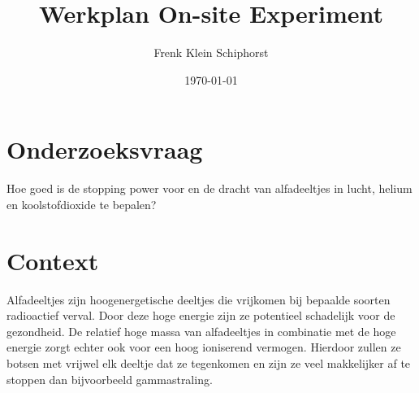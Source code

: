\documentclass[11pt,a4paper]{article}
\author{Frenk Klein Schiphorst} %
\title{Werkplan On-site Experiment} %
\date{\today}
\begin{document}
\suppressfloats[t]      %


\section{Onderzoeksvraag}
Hoe goed is de stopping power voor en de dracht van alfadeeltjes in lucht, helium en koolstofdioxide te bepalen?

\section{Context}
Alfadeeltjes zijn hoogenergetische deeltjes die vrijkomen bij bepaalde soorten radioactief verval. Door deze hoge energie zijn ze potentieel schadelijk voor de gezondheid. De relatief hoge massa van alfadeeltjes in combinatie met de hoge energie zorgt echter ook voor een hoog ioniserend vermogen. Hierdoor zullen ze botsen met vrijwel elk deeltje dat ze tegenkomen en zijn ze veel makkelijker af te stoppen dan bijvoorbeeld gammastraling.
\end{document}
